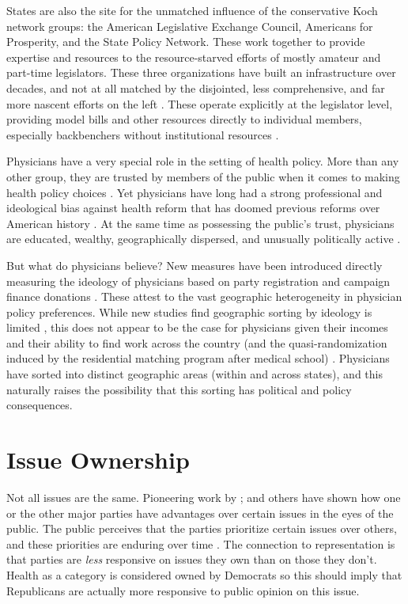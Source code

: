 \documentclass[
  oneside]{book}
\begin{document}
States are also the site for the unmatched influence of the conservative Koch network groups: the American Legislative Exchange Council, Americans for Prosperity, and the State Policy Network. These work together to provide expertise and resources to the resource-starved efforts of mostly amateur and part-time legislators. These three organizations have built an infrastructure over decades, and not at all matched by the disjointed, less comprehensive, and far more nascent efforts on the left \citep{Hertel-Fernandez:2016a}. These operate explicitly at the legislator level, providing model bills and other resources directly to individual members, especially backbenchers without institutional resources \citep{Hertel-Fernandez:2014}.

Physicians have a very special role in the setting of health policy. More than any other group, they are trusted by members of the public when it comes to making health policy choices \citep{Patashnik:2017}. Yet physicians have long had a strong professional and ideological bias against health reform that has doomed previous reforms over American history \citep{Starr:2008, Starr:2013}. At the same time as possessing the public's trust, physicians are educated, wealthy, geographically dispersed, and unusually politically active \citep{Bonica:2017a}.

But what do physicians believe? New measures have been introduced directly measuring the ideology of physicians based on party registration \citep{Bonica:2014, Bonica:2015} and campaign finance donations \citep{Bonica:2017, Bonica:2017a}. These attest to the vast geographic heterogeneity in physician policy preferences. While new studies find geographic sorting by ideology is limited \citep{Mummolo:2017}, this does not appear to be the case for physicians given their incomes and their ability to find work across the country (and the quasi-randomization induced by the residential matching program after medical school) \citep{Bonica:2017a}. Physicians have sorted into distinct geographic areas (within and across states), and this naturally raises the possibility that this sorting has political and policy consequences.

\hypertarget{issue-ownership}{%
\section{Issue Ownership}\label{issue-ownership}}

Not all issues are the same. Pioneering work by \citet{Petrocik:1996}; \citet{Petrocik:2003} and others have shown how one or the other major parties have advantages over certain issues in the eyes of the public. The public perceives that the parties prioritize certain issues over others, and these priorities are enduring over time \citep{Pope:2009, Egan:2013}. The connection to representation is that parties are \emph{less} responsive on issues they own than on those they don't. Health as a category is considered owned by Democrats so this should imply that Republicans are actually more responsive to public opinion on this issue.
\end{document}
